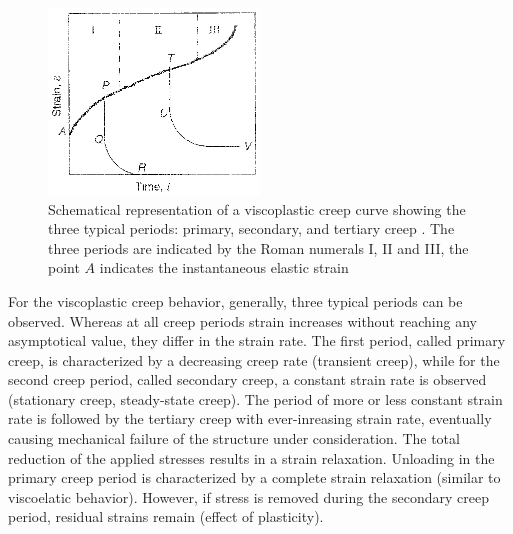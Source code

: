\begin{figure}[htb!]
\begin{center}
\footnotesize
\includegraphics[width=0.5\textwidth]{figures/creep.eps}
\caption{Schematical representation of a viscoplastic creep curve showing the three typical periods: primary, secondary, and tertiary creep \cite{JCZ:2007}. The three periods are indicated by the Roman numerals I, II and III, the point $A$ indicates the instantaneous elastic strain}
\label{fig:creep}
\end{center}
\end{figure}

For the viscoplastic creep behavior, generally, three typical periods can be observed. Whereas at all creep periods strain increases without reaching any asymptotical value, they differ in the strain rate. The first period, called primary creep, is characterized by a decreasing creep rate (transient creep), while for the second creep period, called secondary creep, a constant strain rate is observed (stationary creep, steady-state creep). The period of more or less constant strain rate is followed by the tertiary creep with ever-inreasing strain rate, eventually causing mechanical failure of the structure under consideration. The total reduction of the applied stresses results in a strain relaxation. Unloading in the primary creep period is characterized by a complete strain relaxation (similar to viscoelatic behavior). However, if stress is removed during the secondary creep period, residual strains remain (effect of plasticity).

